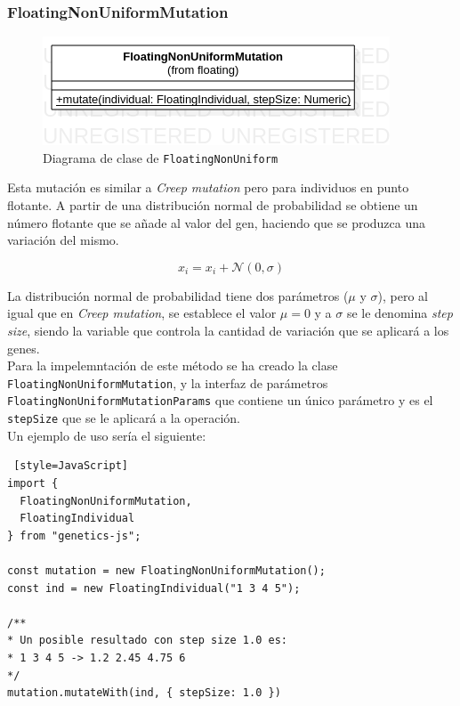 \subsubsection{FloatingNonUniformMutation}

\begin{figure}[ht]
    \centering
    \includegraphics[scale=0.4]{mem/images/cap-4/4.2.7(Mutation)/FloatingNonUniformMutation.png}
    \caption{Diagrama de clase de \texttt{FloatingNonUniform}}
    \label{fig:my_label}
\end{figure}

Esta mutación es similar a \textit{Creep mutation} pero para individuos en punto flotante. A partir de una distribución normal de probabilidad se obtiene un número flotante que se añade al valor del gen, haciendo que se produzca una variación del mismo.

\begin{equation}
    x_i = x_i + \mathcal{N}(0, \sigma)
\end{equation}

La distribución normal de probabilidad tiene dos parámetros ($\mu$ y $\sigma$), pero al igual que en \textit{Creep mutation}, se establece el valor $\mu = 0$ y a $\sigma$ se le denomina \textit{step size}, siendo la variable que controla la cantidad de variación que se aplicará a los genes. \\

Para la impelemntación de este método se ha creado la clase \texttt{FloatingNonUniformMutation}, y la interfaz de parámetros \texttt{FloatingNonUniformMutationParams} que contiene un único parámetro y es el \texttt{stepSize} que se le aplicará a la operación.\\

Un ejemplo de uso sería el siguiente: \\

\begin{lstlisting} [style=JavaScript]
import { 
  FloatingNonUniformMutation,
  FloatingIndividual 
} from "genetics-js";

const mutation = new FloatingNonUniformMutation();
const ind = new FloatingIndividual("1 3 4 5");

/**
* Un posible resultado con step size 1.0 es:
* 1 3 4 5 -> 1.2 2.45 4.75 6
*/
mutation.mutateWith(ind, { stepSize: 1.0 })
\end{lstlisting}

